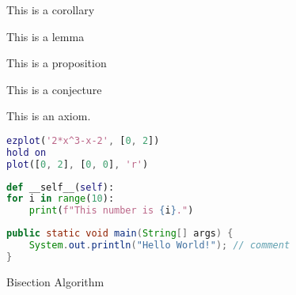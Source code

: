 \begin{cor}{}
	This is a corollary
\end{cor}

\begin{lem}{}
	This is a lemma
\end{lem}

\begin{prop}{}
	This is a proposition
\end{prop}

\begin{conj}{}
	This is a conjecture
\end{conj}

\begin{ax}{}
	This is an axiom.
\end{ax}

\begin{clm}
	
\end{clm}
\begin{clm*}
	
\end{clm*}

\begin{lstlisting}[language = Matlab, title = {Answer.m}]
% Plot function f(x) = 2*x^3 - x - 2
ezplot('2*x^3-x-2', [0, 2])
hold on
plot([0, 2], [0, 0], 'r')
\end{lstlisting}

\begin{lstlisting}[language = Python]
def __self__(self):
for i in range(10):
	print(f"This number is {i}.")
\end{lstlisting}

\begin{lstlisting}[language = java]
public static void main(String[] args) {
	System.out.println("Hello World!"); // comment
}
\end{lstlisting}

\begin{algorithm}
\caption{Bisection Algorithm}
\DontPrintSemicolon
{}
\BlankLine
{}
\end{algorithm}
